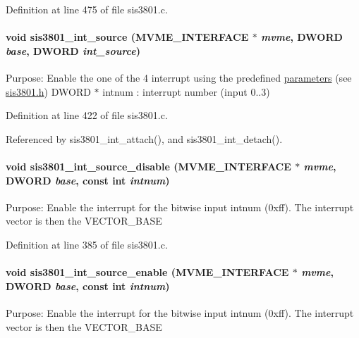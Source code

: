 Definition at line 475 of file sis3801.c.
\paragraph[{sis3801\_\-int\_\-source}]{\setlength{\rightskip}{0pt plus 5cm}void sis3801\_\-int\_\-source ({\bf MVME\_\-INTERFACE} $\ast$ {\em mvme}, \/  {\bf DWORD} {\em base}, \/  {\bf DWORD} {\em int\_\-source})}\hfill\label{sis3801_8h_afabe260ab7dfe46d4114d0938a978f42}
Purpose: Enable the one of the 4 interrupt using the predefined \hyperlink{structparameters}{parameters} (see \hyperlink{sis3801_8h}{sis3801.h}) DWORD $\ast$ intnum : interrupt number (input 0..3) 

Definition at line 422 of file sis3801.c.

Referenced by sis3801\_\-int\_\-attach(), and sis3801\_\-int\_\-detach().
\paragraph[{sis3801\_\-int\_\-source\_\-disable}]{\setlength{\rightskip}{0pt plus 5cm}void sis3801\_\-int\_\-source\_\-disable ({\bf MVME\_\-INTERFACE} $\ast$ {\em mvme}, \/  {\bf DWORD} {\em base}, \/  const int {\em intnum})}\hfill\label{sis3801_8h_a3e7b10aa81fab64857ba1bf01fa0a129}
Purpose: Enable the interrupt for the bitwise input intnum (0xff). The interrupt vector is then the VECTOR\_\-BASE 

Definition at line 385 of file sis3801.c.
\paragraph[{sis3801\_\-int\_\-source\_\-enable}]{\setlength{\rightskip}{0pt plus 5cm}void sis3801\_\-int\_\-source\_\-enable ({\bf MVME\_\-INTERFACE} $\ast$ {\em mvme}, \/  {\bf DWORD} {\em base}, \/  const int {\em intnum})}\hfill\label{sis3801_8h_af6703d63e671731c37eeebcb275464aa}
Purpose: Enable the interrupt for the bitwise input intnum (0xff). The interrupt vector is then the VECTOR\_\-BASE 

